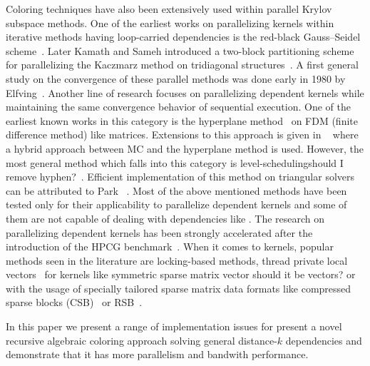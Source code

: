 Coloring techniques have also been extensively used within parallel Krylov subspace methods. One of the earliest works on parallelizing kernels within iterative methods having loop-carried dependencies is the red-black Gauss--Seidel scheme~\cite{RBGS}. Later Kamath and Sameh introduced a two-block partitioning scheme for parallelizing the Kaczmarz method on tridiagonal structures~\cite{Kamath}. A first general study on the convergence of these parallel methods was done early in 1980 by Elfving~\cite{Elfving1980}. Another line of research focuses on parallelizing dependent kernels while maintaining the same convergence behavior of sequential execution. One of the earliest known works in this category is the hyperplane method~\cite{saad} on FDM (finite difference method) like matrices. Extensions to this approach is given in ~\cite{cm-rcm} where a hybrid approach between \acrshort{MC} and the hyperplane method is used. However, the most general method which falls into this category is level-scheduling{\CA should I remove hyphen?}~\cite{saad}.  Efficient implementation of this method on triangular solvers can be attributed to Park \etal  ~\cite{park_ls}. Most of the above mentioned methods have been tested only for their applicability to parallelize \DONE dependent kernels and some of them are not capable of dealing with dependencies like \DTWO. The research on parallelizing \DONE dependent kernels has been strongly accelerated after the introduction of the HPCG benchmark~\cite{hpcg}. When it comes to \DTWO kernels, popular methods seen in the literature are locking-based methods, thread private local vectors~\cite{sparseX,thread_private_symm_spmv} for kernels like symmetric sparse matrix vector {\CA should it be vectors?} or with the usage of specially tailored sparse matrix data formats like compressed sparse blocks (CSB)~\cite{CSB} or \acrfull{RSB}~\cite{RSB}.


In this paper we present a range of implementation issues for present a novel recursive algebraic coloring approach solving general distance-$k$ dependencies and demonstrate that it has more parallelism and bandwith performance.

